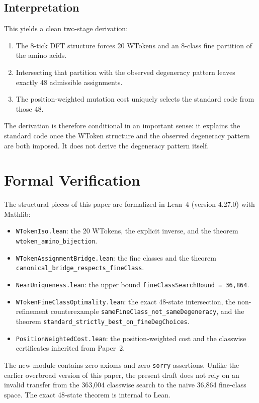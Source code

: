 \documentclass[11pt,twocolumn]{article}
\begin{document}
\subsection{Interpretation}

This yields a clean two-stage derivation:
\begin{enumerate}
\item The 8-tick DFT structure forces 20 WTokens and an 8-class fine
  partition of the amino acids.
\item Intersecting that partition with the observed degeneracy pattern leaves
  exactly 48 admissible assignments.
\item The position-weighted mutation cost uniquely selects the standard code
  from those 48.
\end{enumerate}

The derivation is therefore conditional in an important sense: it explains
the standard code once the WToken structure and the observed degeneracy
pattern are both imposed. It does not derive the degeneracy pattern itself.

\section{Formal Verification}

The structural pieces of this paper are formalized in Lean~4
(version 4.27.0) with Mathlib:

\begin{itemize}
\item \texttt{WTokenIso.lean}: the 20 WTokens, the explicit inverse, and
  the theorem \texttt{wtoken\_amino\_bijection}.
\item \texttt{WTokenAssignmentBridge.lean}: the fine classes and the theorem
  \texttt{canonical\_bridge\_respects\_fineClass}.
\item \texttt{NearUniqueness.lean}: the upper bound
  \texttt{fineClassSearchBound = 36{,}864}.
\item \texttt{WTokenFineClassOptimality.lean}: the exact 48-state
  intersection, the non-refinement counterexample
  \texttt{sameFineClass\_not\_sameDegeneracy}, and the theorem
  \texttt{standard\_strictly\_best\_on\_fineDegChoices}.
\item \texttt{PositionWeightedCost.lean}: the position-weighted cost and the
  classwise certificates inherited from Paper~2.
\end{itemize}

The new module contains zero axioms and zero \texttt{sorry} assertions.
Unlike the earlier overbroad version of this paper, the present draft does
not rely on an invalid transfer from the 363,004 classwise search to the
naive 36,864 fine-class space. The exact 48-state theorem is internal to
Lean.
\end{document}
